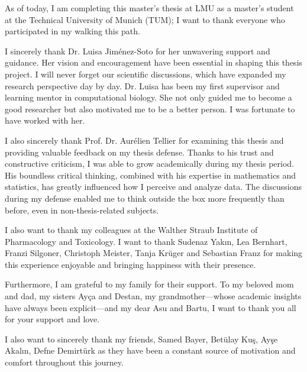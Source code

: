 As of today, I am completing this master's thesis at LMU as a master's student at the Technical University of Munich (TUM); I want to thank everyone who participated in my walking this path.

I sincerely thank Dr. Luisa Jiménez-Soto for her unwavering support and guidance. Her vision and encouragement have been essential in shaping this thesis project. I will never forget our scientific discussions, which have expanded my research perspective day by day. Dr. Luisa has been my first supervisor and learning mentor in computational biology. She not only guided me to become a good researcher but also motivated me to be a better person. I was fortunate to have worked with her.

I also sincerely thank Prof. Dr. Aurélien Tellier for examining this thesis and providing valuable feedback on my thesis defense. Thanks to his trust and constructive criticism, I was able to grow academically during my thesis period. His boundless critical thinking, combined with his expertise in mathematics and statistics, has greatly influenced how I perceive and analyze data. The discussions during my defense enabled me to think outside the box more frequently than before, even in non-thesis-related subjects.

I also want to thank my colleagues at the Walther Straub Institute of Pharmacology and Toxicology. I want to thank Sudenaz Yakın, Lea Bernhart, Franzi Silgoner, Christoph Meister, Tanja Krüger and Sebastian Franz for making this experience enjoyable and bringing happiness with their presence.

Furthermore, I am grateful to my family for their support. To my beloved mom and dad, my sisters Ayça and Destan, my grandmother—whose academic insights have always been explicit—and my dear Asu and Bartu, I want to thank you all for your support and love.

I also want to sincerely thank my friends, Samed Bayer, Betülay Kuş, Ayşe Akalın, Defne Demirtürk as they have been a constant source of motivation and comfort throughout this journey.